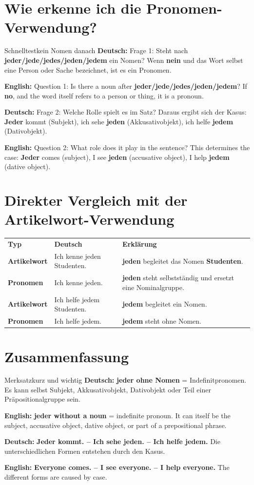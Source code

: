 \documentclass[a4paper,11pt]{article}
\newcommand{\GermanText}[1]{\textbf{Deutsch: }#1\par}
\newcommand{\EnglishText}[1]{{\small\color{SoftGray}\textbf{English: }#1\par}}
\begin{document}
\section{Wie erkenne ich die Pronomen-Verwendung?}
\begin{grammarentry}{Schnelltest}{kein Nomen danach}
\GermanText{Frage 1: Steht nach \textbf{jeder/jede/jedes/jeden/jedem} ein Nomen? Wenn \textbf{nein} und das Wort selbst eine Person oder Sache bezeichnet, ist es ein Pronomen.}
\EnglishText{Question 1: Is there a noun after \textbf{jeder/jede/jedes/jeden/jedem}? If \textbf{no}, and the word itself refers to a person or thing, it is a pronoun.}
\GermanText{Frage 2: Welche Rolle spielt es im Satz? Daraus ergibt sich der Kasus: \textbf{Jeder} kommt (Subjekt), ich sehe \textbf{jeden} (Akkusativobjekt), ich helfe \textbf{jedem} (Dativobjekt).}
\EnglishText{Question 2: What role does it play in the sentence? This determines the case: \textbf{Jeder} comes (subject), I see \textbf{jeden} (accusative object), I help \textbf{jedem} (dative object).}
\end{grammarentry}

\section{Direkter Vergleich mit der Artikelwort-Verwendung}
\begin{longtable}{>{\bfseries}p{3.1cm}|p{5.2cm}|p{5.2cm}}
\rowcolor{HeaderBlueDark}
\color{white}\textbf{Typ} & \color{white}\textbf{Deutsch} & \color{white}\textbf{Erklärung} \\
Artikelwort & Ich kenne jeden Studenten. & \textbf{jeden} begleitet das Nomen \textbf{Studenten}. \\
Pronomen & Ich kenne jeden. & \textbf{jeden} steht selbstständig und ersetzt eine Nominalgruppe. \\
Artikelwort & Ich helfe jedem Studenten. & \textbf{jedem} begleitet ein Nomen. \\
Pronomen & Ich helfe jedem. & \textbf{jedem} steht ohne Nomen. \\
\end{longtable}

\section{Zusammenfassung}
\begin{grammarentry}{Merksatz}{kurz und wichtig}
\GermanText{\textbf{jeder ohne Nomen} = Indefinitpronomen. Es kann selbst Subjekt, Akkusativobjekt, Dativobjekt oder Teil einer Präpositionalgruppe sein.}
\EnglishText{\textbf{jeder without a noun} = indefinite pronoun. It can itself be the subject, accusative object, dative object, or part of a prepositional phrase.}
\GermanText{\textbf{Jeder kommt. -- Ich sehe jeden. -- Ich helfe jedem.} Die unterschiedlichen Formen entstehen durch den Kasus.}
\EnglishText{\textbf{Everyone comes. -- I see everyone. -- I help everyone.} The different forms are caused by case.}
\end{grammarentry}
\end{document}
